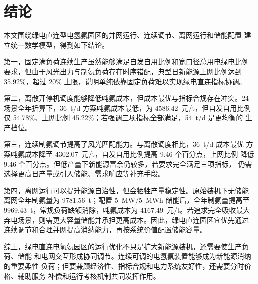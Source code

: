 \section{结论}

本文围绕绿电直连型电氢氨园区的并网运行、连续调节、离网运行和储能配置
建立统一数学模型，得到如下结论。

第一，固定满负荷连续生产虽然能够满足自发自用比例和宽口径总用电绿电比例
要求，但由于风光出力与制氨负荷存在时序错配，典型日新能源上网比例达到
35.92\%，超过 20\% 上限，说明单纯依靠固定负荷难以实现绿电直连指标协调。

第二，离散开停机调度能够降低吨氨成本，但成本最优与指标合规存在冲突。24
场景全年折算下，36~t/d 方案吨氨成本最低，为 4586.42~元/t，但自发自用比例
仅 54.78\%、上网比例 45.22\%；若强调三项指标全部满足，54~t/d 是更均衡的
生产档位。

第三，连续制氨调节提高了风光匹配能力。与离散调度相比，36~t/d 成本最优
方案吨氨成本降至 4302.07~元/t，自发自用比例提高 9.46 个百分点，上网比例
降低 9.46 个百分点。但低产量下新能源富余仍较多，若要求完全满足三项指标，
仍需选择更高日产量或引入储能、需求响应等补充手段。

第四，离网运行可以提升能源自治性，但会牺牲产量稳定性。原始装机下无储能
离网全年制氨量为 9781.56~t；配置 5~MW/5~MWh 储能后，全年制氨量提高至
9969.43~t，常规负荷缺额消除，吨氨成本为 4167.49~元/t。若追求完全吸收最大
弃电场景，则需更大容量储能并承担更高成本。因此，绿电直连园区宜优先通过
连续调节和合理并网提高消纳能力，再按系统价值配置储能容量。

综上，绿电直连电氢氨园区的运行优化不只是扩大新能源装机，还需要使生产负荷、储能
和电网交互形成协同调节。连续可调的电氢氨装置能够成为新能源消纳的重要柔性
负荷；但要兼顾经济性、指标合规和电力系统友好性，还需要分时价格、辅助服务
补偿和运行考核机制共同发挥作用。
